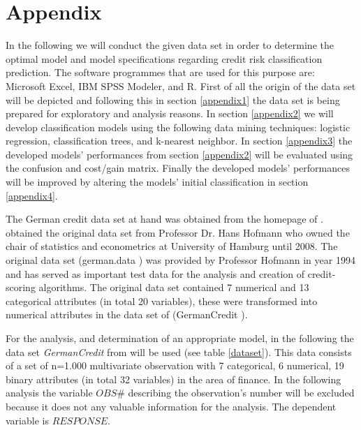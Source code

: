 \chapter{Appendix} \label{appendix}
In the following we will conduct the given data set in order to determine the optimal model and model specifications regarding credit risk classification prediction. The software programmes that are used for this purpose are: Microsoft Excel, IBM SPSS Modeler, and R. First of all the origin of the data set will be depicted and following this in section \ref{appendix1} the data set is being prepared for exploratory and analysis reasons. In section \ref{appendix2} we will develop classification models using the following data mining techniques: logistic regression, classification trees, and k-nearest neighbor. In section \ref{appendix3} the developed models' performances from section \ref{appendix2} will be evaluated using the confusion and cost/gain matrix. Finally the developed models' performances will be improved by altering the models' initial classification in section \ref{appendix4}.

The German credit data set at hand was obtained from the homepage of \cite{shmueli}. \cite{shmueli} obtained the original data set from Professor Dr. Hans Hofmann who owned the chair of statistics and econometrics at University of Hamburg until 2008. The original data set (german.data \citep{mld}) was provided by Professor Hofmann in year 1994 and has served as important test data for the analysis and creation of credit-scoring algorithms. The original data set contained 7 numerical and 13 categorical attributes (in total 20 variables), these were transformed into numerical attributes in the data set of \cite{shmueli} (GermanCredit \citep{shmueli}). 

For the analysis, and determination of an appropriate model, in the following the data set \textit{GermanCredit} from \cite{shmueli} will be used (see table \ref{dataset}). This data consists of a set of n=1.000 multivariate observation with 7 categorical, 6 numerical, 19 binary attributes (in total 32 variables) in the area of finance. In the following analysis the variable $ OBS\#$ describing the observation's number will be excluded because it does not any valuable information for the analysis. The dependent variable is $RESPONSE$.%


